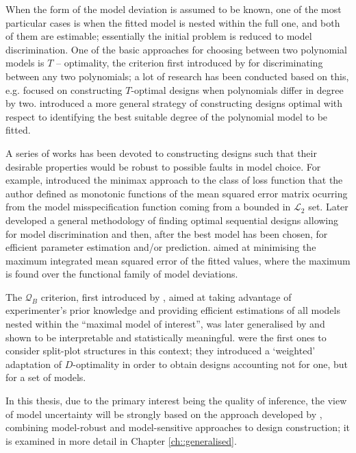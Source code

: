 When the form of the model deviation is assumed to be known, one of the most particular cases is when the fitted model is nested within the full one, and both of them are estimable; essentially the initial problem is reduced to model discrimination. One of the basic approaches for choosing between two polynomial models is $T$ -- optimality, the criterion first introduced by \cite{Atkinson1975Design} for discriminating between any two polynomials; a lot of research has been conducted based on this, e.g. \cite{Dette2012T} focused on constructing $T$-optimal designs when polynomials differ in degree by two. \cite{Dette1995Optimal} introduced a more general strategy of constructing designs optimal with respect to identifying the best suitable degree of the polynomial model to be fitted.

A series of works has been devoted to constructing designs such that their desirable properties would be robust to possible faults in model choice. For example, \cite{Wiens1992Minimax} introduced the minimax approach to the class of loss function that the author defined as monotonic functions of the mean squared error matrix ocurring from the model misspecification function coming from a bounded in $\mathcal{L}_2$ set. Later \cite{Wiens2009Robust} developed a general methodology of finding optimal sequential designs allowing for model discrimination and then, after the best model has been chosen, for efficient parameter estimation and/or prediction. \cite{Wiens2000Bias} aimed at minimising the maximum integrated mean squared error of the fitted values, where the maximum is found over the functional family of model deviations. 

The $\mathcal{Q}_{B}$ criterion, first introduced by \cite{Tsai2007Three}, aimed at taking advantage of experimenter's prior knowledge and providing efficient estimations of all models nested within the ``maximal model of interest'', was later generalised by \cite{Tsai2010General} and shown to be interpretable and statistically meaningful. \cite{Smucker2012Model} were the first ones to consider split-plot structures in this context; they introduced a `weighted' adaptation of $D$-optimality in order to obtain designs accounting not for one, but for a set of models.

In this thesis, due to the primary interest being the quality of inference, the view of model uncertainty will be strongly based on the approach developed by \cite{Goos2005model}, combining model-robust and model-sensitive approaches to design construction; it is examined in more detail in Chapter \ref{ch::generalised}. 

